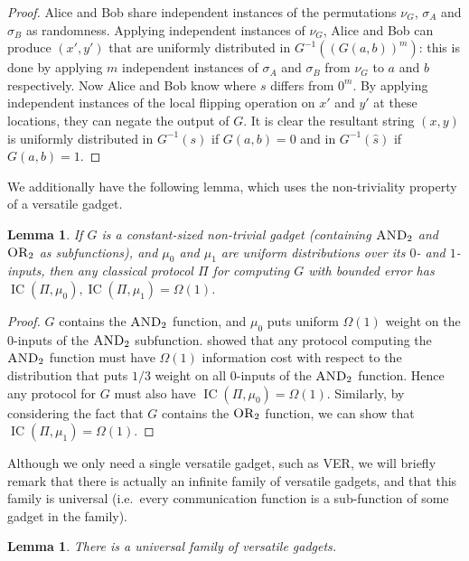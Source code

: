 \documentclass[10pt,a4paper]{article}
\newtheorem{lemma}[theorem]{Lemma}
\theoremstyle{definition}
\renewcommand{\>}{\rangle}
\newcommand{\<}{\langle}
\newcommand{\OR}{\textsc{OR}}
\newcommand{\AND}{\textsc{AND}}
\DeclareMathOperator{\IC}{IC}
\begin{document}
\begin{proof}
Alice and Bob share independent instances of the permutations $\nu_G$, $\sigma_A$ and $\sigma_B$ as randomness. Applying independent instances of $\nu_G$, Alice and Bob can produce $(x',y')$ that are uniformly distributed in $G^{-1}((G(a,b))^m)$: this is done by applying $m$ independent instances of $\sigma_A$ and $\sigma_B$ from $\nu_G$ to $a$ and $b$ respectively. Now Alice and Bob know where $s$ differs from $0^m$. By applying independent instances of the local flipping operation on $x'$ and $y'$ at these locations, they can negate the output of $G$. It is clear the resultant string $(x,y)$ is uniformly distributed in $G^{-1}(s)$ if $G(a,b)=0$ and in $G^{-1}(\hat{s})$ if $G(a,b)=1$.
\end{proof}

We additionally have the following lemma, which
uses the non-triviality property of a versatile gadget.

\begin{lemma}\label{lem:ANDOR-classical}
If $G$ is a constant-sized non-trivial gadget (containing $\AND_2$ and $\OR_2$ as subfunctions), and $\mu_0$ and 
$\mu_1$ are uniform distributions over its $0$- and $1$-inputs, 
then any classical protocol $\Pi$ for computing $G$ with bounded 
error has $\IC(\Pi,\mu_0), \IC(\Pi,\mu_1) = \Omega(1)$.
\end{lemma}

\begin{proof}
$G$ contains the $\AND_2$ function, and $\mu_0$ puts uniform 
$\Omega(1)$ weight on the 0-inputs of the $\AND_2$ subfunction. 
\cite{BJKS04} showed that any protocol computing the $\AND_2$ 
function must have $\Omega(1)$ information cost with
respect to the distribution that puts
$1/3$ weight on all $0$-inputs of the $\AND_2$ function. Hence any 
protocol for $G$ must also have $\IC(\Pi,\mu_0)=\Omega(1)$. 
Similarly, by considering the fact that $G$ contains the $\OR_2$ 
function, we can show that $\IC(\Pi,\mu_1)=\Omega(1)$.
\end{proof}


Although we only need a single versatile gadget,
such as \textsc{VER}, we will briefly remark that there is
actually an infinite family of versatile gadgets, and that
this family is universal (i.e.\ every communication function
is a sub-function of some gadget in the family).

\begin{lemma}
There is a universal family of versatile gadgets.
\end{lemma}
\end{document}
